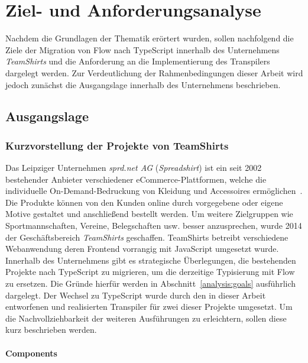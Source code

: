 \chapter{Ziel- und Anforderungsanalyse}
\label{chap:analysis}

Nachdem die Grundlagen der Thematik erörtert wurden, sollen nachfolgend die Ziele der Migration von Flow nach TypeScript innerhalb des Unternehmens \textit{TeamShirts} und die Anforderung an die Implementierung des Transpilers dargelegt werden. Zur Verdeutlichung der Rahmenbedingungen dieser Arbeit wird jedoch zunächst die Ausgangslage innerhalb des Unternehmens beschrieben.

\section{Ausgangslage}
\label{sec:status-quo}


\subsection{Kurzvorstellung der Projekte von TeamShirts}

Das Leipziger Unternehmen \textit{sprd.net AG} (\textit{Spreadshirt}) ist ein seit 2002 bestehender Anbieter verschiedener eCommerce-Plattformen, welche die individuelle On-Demand-Bedruckung von Kleidung und Accessoires ermöglichen~\autocite{SPREADSHIRT:ABOUT}. Die Produkte können von den Kunden online durch vorgegebene oder eigene Motive gestaltet und anschließend bestellt werden. Um weitere Zielgruppen wie Sportmannschaften, Vereine, Belegschaften usw. besser anzusprechen, wurde 2014 der Geschäftsbereich \textit{TeamShirts} geschaffen.
TeamShirts betreibt verschiedene Webanwendung deren Frontend vorrangig mit JavaScript umgesetzt wurde. Innerhalb des Unternehmens gibt es strategische Überlegungen, die bestehenden Projekte nach TypeScript zu migrieren, um die derzeitige Typisierung mit Flow zu ersetzen. Die Gründe hierfür werden in Abschnitt~\ref{analysis:goals} ausführlich dargelegt. Der Wechsel zu TypeScript wurde durch den in dieser Arbeit entworfenen und realisierten Transpiler für zwei dieser Projekte umgesetzt. Um die Nachvollziehbarkeit der weiteren Ausführungen zu erleichtern, sollen diese kurz beschrieben werden.

\subsubsection{Components}

